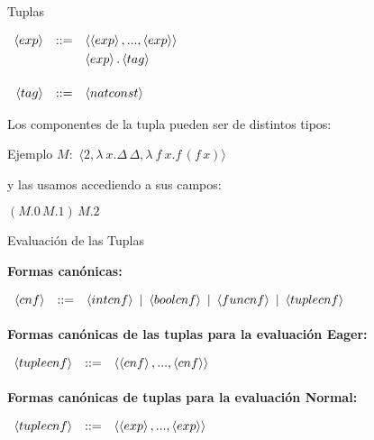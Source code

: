 \documentclass[handout]{beamer}
\newcommand{\cnf}{\left\langle cnf\right\rangle}
\newcommand{\intcnf}{\left\langle intcnf\right\rangle}
\newcommand{\boolcnf}{\left\langle boolcnf\right\rangle}
\newcommand{\funcnf}{\left\langle funcnf\right\rangle}
\newcommand{\tuplecnf}{\left\langle tuplecnf\right\rangle}
\newcommand{\ex}{\left\langle exp\right\rangle}
\newcommand{\natconst}{\left\langle natconst\right\rangle}
\newcommand{\tagexp}{\left\langle tag \right\rangle}
\begin{document}
\begin{frame}{Tuplas}

$
\begin{array}{rlllll}
\ex & ::= & \langle \ex,...,\ex \rangle\smallskip\\
& & \ex. \tagexp \smallskip\\
& &\\
\tagexp &::= &\natconst\\
\end{array}
$ \pause

\bigskip

Los componentes de la tupla pueden ser de distintos tipos:\medskip

Ejemplo $M :$  $\langle 2, \lambda\ x . \Delta\,\Delta, \lambda\ f\ x. f\, (f\, x)  \rangle $\medskip \pause

y las usamos accediendo a sus campos:

$(M.0\, M.1)\,M.2 $


\end{frame}



\begin{frame}{Evaluación de las Tuplas}

\textbf{Formas canónicas: }

\medskip

$
\begin{array}{rlllll}
\cnf & ::= & \intcnf\ | \  \boolcnf\ | \ \funcnf \ | \  \tuplecnf\smallskip\\
\end{array}
$
\pause
\bigskip

\textbf{Formas canónicas de las tuplas para la evaluación Eager: }

\medskip

$
\begin{array}{rlllll}
\tuplecnf & ::= & \langle\cnf,...,\cnf\rangle\smallskip\\
\end{array}
$
\pause

\bigskip

\textbf{Formas canónicas de tuplas para la evaluación Normal: }

\medskip

$
\begin{array}{rlllll}
\tuplecnf & ::= & \langle\ex,...,\ex\rangle\smallskip\\
\end{array}
$

\end{frame}
\end{document}
